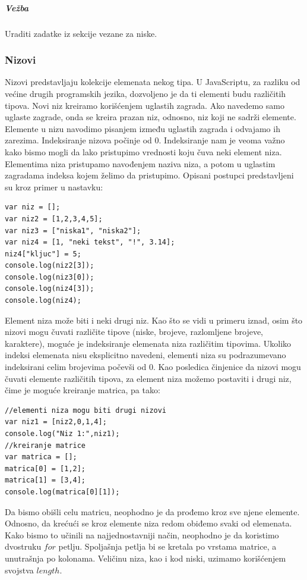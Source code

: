 \documentclass[a4paper]{article}
\begin{document}
\subparagraph{Vežba}
Uraditi zadatke iz sekcije vezane za niske.

\subsubsection{Nizovi}
Nizovi predstavljaju kolekcije elemenata nekog tipa. U JavaScriptu, za razliku od većine drugih programskih jezika, dozvoljeno je da ti elementi budu različitih tipova. Novi niz kreiramo korišćenjem uglastih zagrada. Ako navedemo samo uglaste zagrade, onda se kreira prazan niz, odnosno, niz koji ne sadrži elemente. Elemente u nizu navodimo pisanjem između uglastih zagrada i odvajamo ih zarezima. Indeksiranje nizova počinje od 0. Indeksiranje nam je veoma važno kako bismo mogli da lako pristupimo vrednosti koju čuva neki element niza. Elementima niza pristupamo navođenjem naziva niza, a potom u uglastim zagradama indeksa kojem želimo da pristupimo. Opisani postupci predstavljeni su kroz primer u nastavku:
\begin{lstlisting}[backgroundcolor = \color{lightgray}]
var niz = [];
var niz2 = [1,2,3,4,5];
var niz3 = ["niska1", "niska2"];
var niz4 = [1, "neki tekst", "!", 3.14];
niz4["kljuc"] = 5;
console.log(niz2[3]);
console.log(niz3[0]);
console.log(niz4[3]);
console.log(niz4);
\end{lstlisting}
Element niza može biti i neki drugi niz. Kao što se vidi u primeru iznad, osim što nizovi mogu čuvati različite tipove (niske, brojeve, razlomljene brojeve, karaktere), moguće je indeksiranje elemenata niza različitim tipovima. Ukoliko indeksi elemenata nisu eksplicitno navedeni, elementi niza su podrazumevano indeksirani celim brojevima počevši od 0. Kao posledica činjenice da nizovi mogu čuvati elemente različitih tipova, za element niza možemo postaviti i drugi niz, čime je moguće kreiranje matrica, pa tako:
\begin{lstlisting}[backgroundcolor = \color{lightgray}]
//elementi niza mogu biti drugi nizovi
var niz1 = [niz2,0,1,4];
console.log("Niz 1:",niz1);
//kreiranje matrice
var matrica = [];
matrica[0] = [1,2];
matrica[1] = [3,4];
console.log(matrica[0][1]);
\end{lstlisting}
Da bismo obišli celu matricu, neophodno je da prođemo kroz sve njene elemente. Odnosno, da krećući se kroz elemente niza redom obiđemo svaki od elemenata. Kako bismo to učinili na najjednostavniji način, neophodno je da koristimo dvostruku $for$ petlju. Spoljašnja petlja bi se kretala po vrstama matrice, a unutrašnja po kolonama. Veličinu niza, kao i kod niski, uzimamo korišćenjem svojstva $length$.
\end{document}
